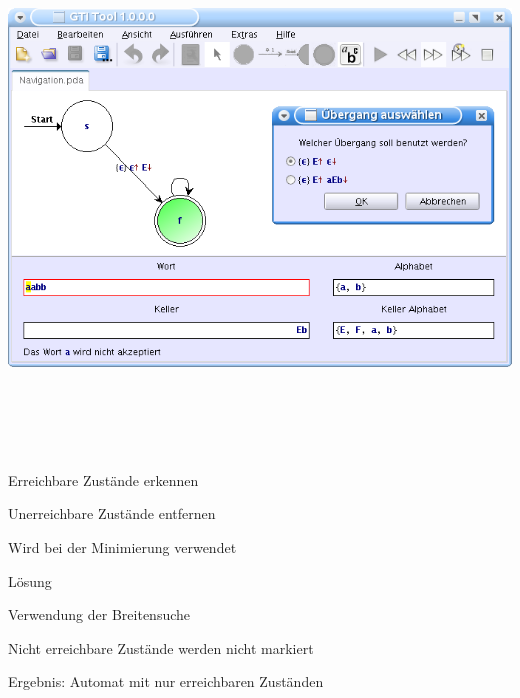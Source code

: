 {
  \begin{center}
    \includegraphics[height=14cm]{../images/grammar_pda.png}
  \end{center}
}


{
    \begin{itemgroup}{}
	\item Erreichbare Zustände erkennen
	\item Unerreichbare Zustände entfernen
	\item Wird bei der Minimierung verwendet
    \end{itemgroup}

    \begin{itemgroup}{Lösung}
	\item Verwendung der Breitensuche
	\item Nicht erreichbare Zustände werden nicht markiert
	\item Ergebnis: Automat mit nur erreichbaren Zuständen
	\end{itemgroup}
    
    \vfill{}
}


